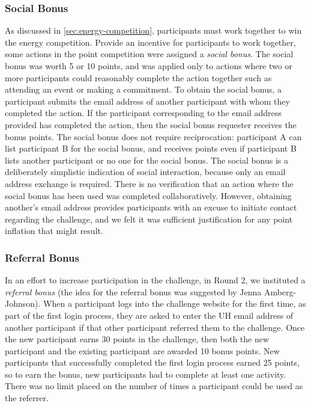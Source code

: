 \subsubsection{Social Bonus}

As discussed in \autoref{sec:energy-competition}, participants must work together to win the energy competition. Provide an incentive for participants to work together, some actions in the point competition were assigned a \emph{social bonus}. The social bonus was worth 5 or 10 points, and was applied only to actions where two or more participants could reasonably complete the action together such as attending an event or making a commitment. To obtain the social bonus, a participant submits the email address of another participant with whom they completed the action. If the participant corresponding to the email address provided has completed the action, then the social bonus requester receives the bonus points. The social bonus does not require reciprocation: participant A can list participant B for the social bonus, and receives points even if participant B lists another participant or no one for the social bonus. The social bonus is a deliberately simplistic indication of social interaction, because only an email address exchange is required. There is no verification that an action where the social bonus has been used was completed collaboratively. However, obtaining another's email address provides participants with an excuse to initiate contact regarding the challenge, and we felt it was sufficient justification for any point inflation that might result.


\subsubsection{Referral Bonus}
\label{sec:referral-bonus}

In an effort to increase participation in the challenge, in Round 2, we instituted a \emph{referral bonus} (the idea for the referral bonus was suggested by Jenna Amberg-Johnson). When a participant logs into the challenge website for the first time, as part of the first login process, they are asked to enter the UH email address of another participant if that other participant referred them to the challenge. Once the new participant earns 30 points in the challenge, then both the new participant and the existing participant are awarded 10 bonus points. New participants that successfully completed the first login process earned 25 points, so to earn the bonus, new participants had to complete at least one activity. There was no limit placed on the number of times a participant could be used as the referrer.


